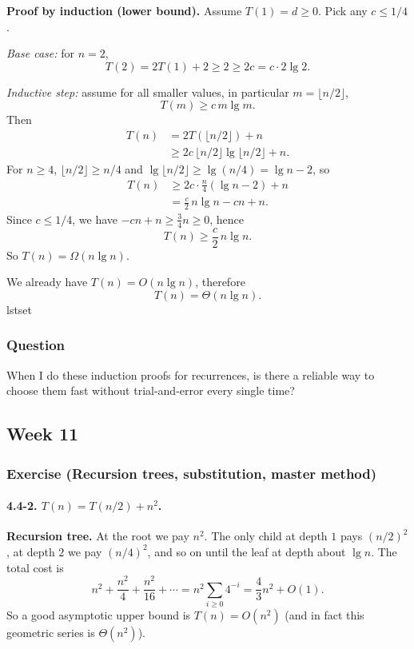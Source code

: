 \documentclass{article}
\theoremstyle{theorem}
\theoremstyle{definition}
\theoremstyle{remark}
\begin{document}
\textbf{Proof by induction (lower bound).}  
Assume $T(1)=d\ge 0$. Pick any $c\le 1/4$.

\textit{Base case:} for $n=2$,
\[
T(2)=2T(1)+2\ge 2 \ge 2c = c\cdot 2\lg 2.
\]

\textit{Inductive step:} assume for all smaller values, in particular $m=\lfloor n/2\rfloor$,
\[
T(m)\ge c\,m\lg m.
\]
Then
\begin{align*}
T(n) &= 2T(\lfloor n/2\rfloor)+n \\
&\ge 2c\,\lfloor n/2\rfloor\lg\!\lfloor n/2\rfloor + n.
\end{align*}
For $n\ge 4$, $\lfloor n/2\rfloor\ge n/4$ and $\lg\lfloor n/2\rfloor\ge \lg(n/4)=\lg n-2$, so
\begin{align*}
T(n) &\ge 2c\cdot \frac n4 (\lg n-2)+n \\
&= \frac c2\,n\lg n - cn + n.
\end{align*}
Since $c\le 1/4$, we have $-cn+n\ge \tfrac34 n\ge 0$, hence
\[
T(n)\ge \frac c2\,n\lg n.
\]
So $T(n)=\Omega(n\lg n)$.

We already have $T(n)=O(n\lg n)$, therefore
\[
T(n)=\Theta(n\lg n).
\]
lstset
\subsubsection*{Question}
When I do these induction proofs for recurrences, is there a reliable way to choose them fast without trial-and-error every single time?

\subsection{Week 11}\label{sec:week11}

\subsubsection*{Exercise (Recursion trees, substitution, master method)}

\paragraph{4.4-2. $T(n)=T(n/2)+n^2$.}
\textbf{Recursion tree.} At the root we pay $n^2$. The only child at depth $1$ pays $(n/2)^2$, at depth $2$ we pay $(n/4)^2$, and so on until the leaf at depth about $\lg n$. The total cost is
\[
n^2 + \frac{n^2}{4} + \frac{n^2}{16} + \cdots
= n^2\sum_{i\ge 0} 4^{-i}
= \frac{4}{3}n^2 + O(1).
\]
So a good asymptotic upper bound is $T(n)=O(n^2)$ (and in fact this geometric series is $\Theta(n^2)$).
\end{document}
